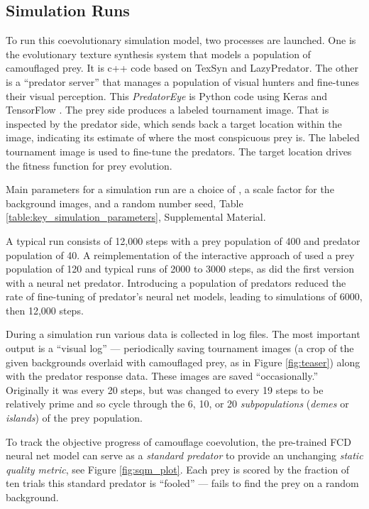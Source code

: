 \documentclass[letterpaper]{article}
\newcommand{\jargon}[1]{\textit{#1}}
\newcommand{\texsyn}[0]{TexSyn}
\newcommand{\lazypredator}[0]{LazyPredator}
\newcommand{\predatoreye}[0]{PredatorEye}
\begin{document}
\subsection{Simulation Runs}
\label{subsec:simulation_runs}
To run this coevolutionary simulation model, two processes are launched. One is the evolutionary texture synthesis system that models a population of camouflaged prey. It is c++ code based on \texsyn{} and \lazypredator{}. The other is a “predator server” that manages a population of visual hunters and fine-tunes their visual perception. This \jargon{\predatoreye{}} \citep{reynolds_predatoreye_2021} is Python code using Keras \citep{chollet_keras_2015} and TensorFlow \citep{tensorflow_whitepaper_2015}. The prey side produces a labeled tournament image. That is inspected by the predator side, which sends back a target location within the image, indicating its estimate of where the most conspicuous prey is. The labeled tournament image is used to fine-tune the predators. The target location drives the fitness function for prey evolution.
\par
Main parameters for a simulation run are a choice of , a scale factor for the background images, and a random number seed, Table \ref{table:key_simulation_parameters}, Supplemental Material.
\par
A typical run consists of 12,000 steps with a prey population of 400 and predator population of 40. A reimplementation of the interactive approach of \citet{reynolds_iec_2011} used a prey population of 120 and typical runs of 2000 to 3000 steps, as did the first version with a neural net predator. Introducing a population of predators reduced the rate of fine-tuning of predator's neural net models, leading to simulations of 6000, then 12,000 steps.
\par
During a simulation run various data is collected in log files. The most important output is a “visual log” — periodically saving tournament images (a crop of the given backgrounds overlaid with camouflaged prey, as in Figure \ref{fig:teaser}) along with the predator response data. These images are saved “occasionally.” Originally it was every 20 steps, but was changed to every 19 steps to be relatively prime and so cycle through the 6, 10, or 20 \jargon{subpopulations} (\jargon{demes} or \jargon{islands}) of the prey population.
\par
To track the objective progress of camouflage coevolution, the pre-trained FCD neural net model can serve as a \jargon{standard predator} to provide an unchanging \jargon{static quality metric}, see Figure \ref{fig:sqm_plot}. Each prey is scored by the fraction of ten trials this standard predator is “fooled” — fails to find the prey on a random background.
\par
\end{document}
